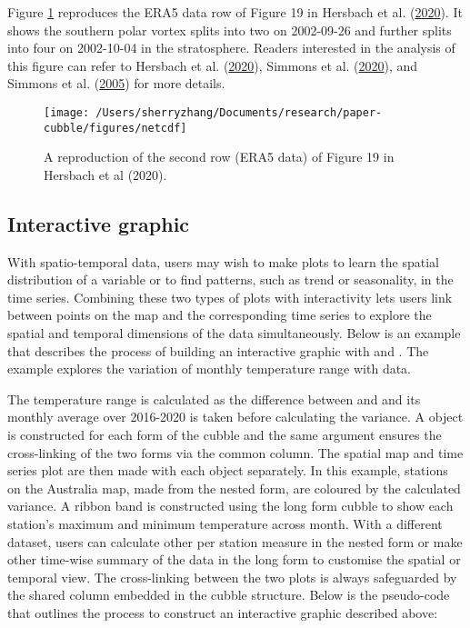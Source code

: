 \documentclass{article}
\begin{document}
Figure \ref{fig:netcdf} reproduces the ERA5 data row of Figure 19 in Hersbach et al. (\protect\hyperlink{ref-hersbach2020era5}{2020}). It shows the southern polar vortex splits into two on 2002-09-26 and further splits into four on 2002-10-04 in the stratosphere. Readers interested in the analysis of this figure can refer to Hersbach et al. (\protect\hyperlink{ref-hersbach2020era5}{2020}), Simmons et al. (\protect\hyperlink{ref-simmons2020global}{2020}), and Simmons et al. (\protect\hyperlink{ref-simmons2005ecmwf}{2005}) for more details.

\begin{figure}
\texttt{[image: /Users/sherryzhang/Documents/research/paper-cubble/figures/netcdf]} \caption{A reproduction of the second row (ERA5 data) of Figure 19 in Hersbach et al (2020).}\label{fig:netcdf}
\end{figure}

\hypertarget{interactive-graphic}{%
\subsection{Interactive graphic}\label{interactive-graphic}}

With spatio-temporal data, users may wish to make plots to learn the spatial distribution of a variable or to find patterns, such as trend or seasonality, in the time series. Combining these two types of plots with interactivity lets users link between points on the map and the corresponding time series to explore the spatial and temporal dimensions of the data simultaneously. Below is an example that describes the process of building an interactive graphic with  and . The example explores the variation of monthly temperature range with  data.

The temperature range is calculated as the difference between  and  and its monthly average over 2016-2020 is taken before calculating the variance. A  object is constructed for each form of the cubble and the same  argument ensures the cross-linking of the two forms via the common  column. The spatial map and time series plot are then made with each  object separately. In this example, stations on the Australia map, made from the nested form, are coloured by the calculated variance. A ribbon band is constructed using the long form cubble to show each station's maximum and minimum temperature across month. With a different dataset, users can calculate other per station measure in the nested form or make other time-wise summary of the data in the long form to customise the spatial or temporal view. The cross-linking between the two plots is always safeguarded by the shared  column embedded in the cubble structure. Below is the pseudo-code that outlines the process to construct an interactive graphic described above:
\end{document}
